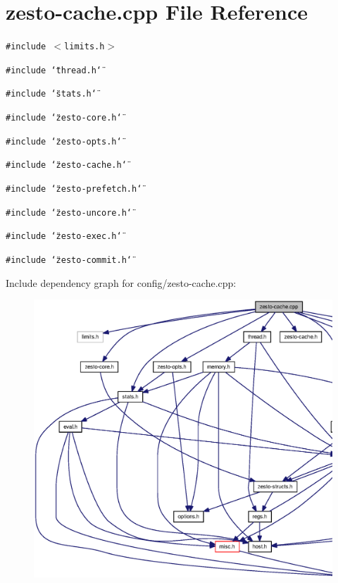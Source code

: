 \section{zesto-cache.cpp File Reference}
\label{config_2zesto-cache_8cpp}
{\tt \#include $<$limits.h$>$}\par
{\tt \#include \char`\"{}thread.h\char`\"{}}\par
{\tt \#include \char`\"{}stats.h\char`\"{}}\par
{\tt \#include \char`\"{}zesto-core.h\char`\"{}}\par
{\tt \#include \char`\"{}zesto-opts.h\char`\"{}}\par
{\tt \#include \char`\"{}zesto-cache.h\char`\"{}}\par
{\tt \#include \char`\"{}zesto-prefetch.h\char`\"{}}\par
{\tt \#include \char`\"{}zesto-uncore.h\char`\"{}}\par
{\tt \#include \char`\"{}zesto-exec.h\char`\"{}}\par
{\tt \#include \char`\"{}zesto-commit.h\char`\"{}}\par


Include dependency graph for config/zesto-cache.cpp:\nopagebreak
\begin{figure}[H]
\begin{center}
\leavevmode
\includegraphics[width=420pt]{config_2zesto-cache_8cpp__incl}
\end{center}
\end{figure}
